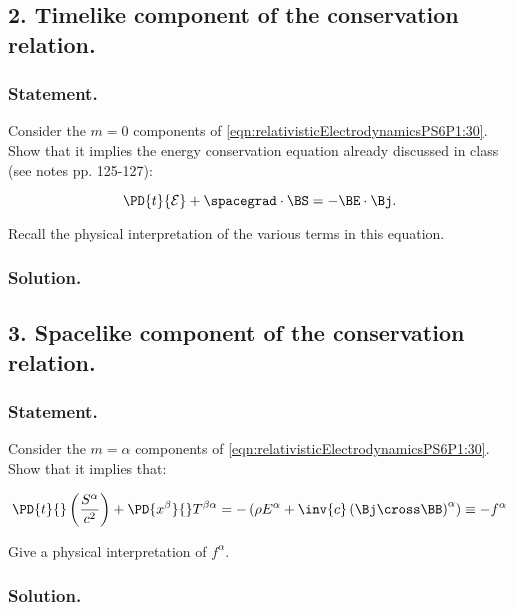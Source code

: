 \subsection{2. Timelike component of the conservation relation.}

\subsubsection{Statement.}

Consider the $m = 0$ components of \ref{eqn:relativisticElectrodynamicsPS6P1:30}.  Show that it implies the energy conservation equation already discussed in class (see notes pp. 125-127):

\begin{equation}\label{eqn:relativisticElectrodynamicsPS6P1:40}
\PD{t}{\mathcal{E}} + \spacegrad \cdot \BS = - \BE \cdot \Bj.
\end{equation}

Recall the physical interpretation of the various terms in this equation.

\subsubsection{Solution.}

\subsection{3. Spacelike component of the conservation relation.}

\subsubsection{Statement.}

Consider the $m = \alpha$ components of \ref{eqn:relativisticElectrodynamicsPS6P1:30}.  Show that it implies that:

\begin{equation}\label{eqn:relativisticElectrodynamicsPS6P1:40}
\PD{t}{}\left( \frac{S^\alpha}{c^2} \right) + \PD{x^\beta}{} T^{\beta \alpha}
= - \left( \rho E^\alpha + \inv{c} \left( \Bj \cross \BB \right)^\alpha \right) \equiv - f^\alpha
\end{equation}

Give a physical interpretation of $f^\alpha$.

\subsubsection{Solution.}

